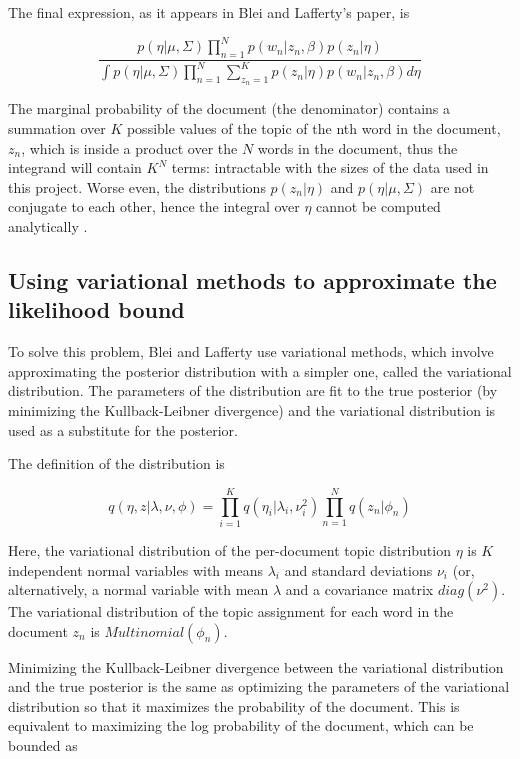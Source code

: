 \documentclass[12pt,a4paper,twoside,openright]{report}
\begin{document}
The final expression, as it appears in Blei and Lafferty's paper, is

\begin{equation}
\frac{p(\eta | \mu, \Sigma) \prod\limits_{n=1}^N p(w_n | z_n, \beta) p(z_n | \eta)}{\int p(\eta | \mu, \Sigma)  \prod\limits_{n=1}^N \sum\limits_{z_n=1}^K p(z_n | \eta) p(w_n | z_n, \beta) d\eta}
\end{equation}

The marginal probability of the document (the denominator) contains a summation over $K$ possible values of the topic of the nth word in the document, $z_n$, which is inside a product over the $N$ words in the document, thus the integrand will contain $K^N$ terms: intractable with the sizes of the data used in this project. Worse even, the distributions $p(z_n | \eta)$ and $p(\eta | \mu, \Sigma)$ are not conjugate to each other, hence the integral over $\eta$ cannot be computed analytically \cite{fink1997compendium}.

\subsection{Using variational methods to approximate the likelihood bound}

To solve this problem, Blei and Lafferty use variational methods, which involve approximating the posterior distribution with a simpler one, called the variational distribution. The parameters of the distribution are fit to the true posterior (by minimizing the Kullback-Leibner divergence) and the variational distribution is used as a substitute for the posterior.

The definition of the distribution is

\begin{equation}
q(\eta, z | \lambda, \nu, \phi) = \prod\limits_{i=1}^K q(\eta_i|\lambda_i, \nu_i^2) \prod\limits_{n=1}^N q(z_n | \phi_n)
\end{equation}

Here, the variational distribution of the per-document topic distribution $\eta$ is $K$ independent normal variables with means $\lambda_i$ and standard deviations $\nu_i$ (or, alternatively, a normal variable with mean $\lambda$ and a covariance matrix $\mathit{diag}(\nu^2)$. The variational distribution of the topic assignment for each word in the document $z_n$ is $\mathit{Multinomial}(\phi_n)$.

Minimizing the Kullback-Leibner divergence between the variational distribution and the true posterior is the same as optimizing the parameters of the variational distribution so that it maximizes the probability of the document. This is equivalent to maximizing the log probability of the document, which can be bounded as
\end{document}
